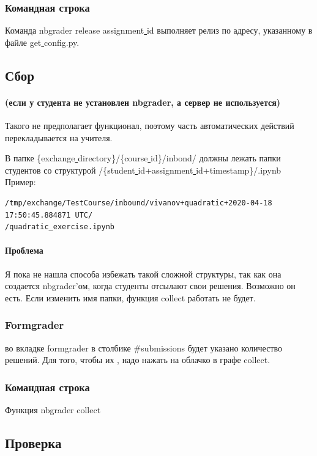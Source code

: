\documentclass[a4paper,12pt]{article}
\begin{document}
\subsubsection{Командная строка}

Команда nbgrader release assignment\underline{ }id выполняет релиз по адресу, указанному в файле get\underline{ }config.py.
\subsection{Сбор}

\paragraph{(если у студента не установлен nbgrader, а сервер не используется)}
Такого не предполагает функционал, поэтому часть автоматических действий перекладывается на учителя.

В папке
 \{exchange\underline{ }directory\}/\{course\underline{ }id\}/inbond/ должны лежать папки студентов со структурой
/\{student\underline{ }id+assignment\underline{ }id+timestamp\}/.ipynb
\\Пример: 
\begin{verbatim}
/tmp/exchange/TestCourse/inbound/vivanov+quadratic+2020-04-18 17:50:45.884871 UTC/
/quadratic_exercise.ipynb
\end{verbatim}
\paragraph{Проблема}Я пока не нашла способа избежать такой сложной структуры, так как она создается nbgrader'ом, когда студенты отсылают свои решения. Возможно он есть. Если изменить имя папки, функция collect работать не будет.
\subsubsection{Formgrader}

во вкладке formgrader в столбике \#submissions будет указано количество решений. Для того, чтобы их \grqq, надо нажать на облачко в графе collect.
\subsubsection{Командная строка}

Функция nbgrader collect 
\subsection{Проверка}
\end{document}
